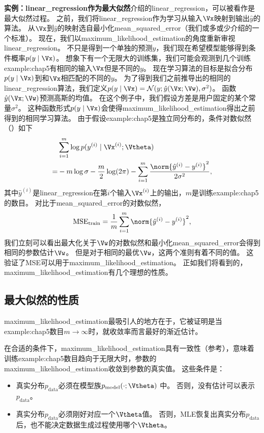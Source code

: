 \textbf{实例：\gls{linear_regression}作为最大似然}\quad {}介绍的\gls{linear_regression}，可以被看作是最大似然过程。
之前，我们将\gls{linear_regression}作为学习从输入$\Vx$映射到输出$\hat{y}$的算法。
从$\Vx$到$\hat{y}$的映射选自最小化\gls{mean_squared_error}（我们或多或少介绍的一个标准）。
现在，我们以\gls{maximum_likelihood_estimation}的角度重新审视\gls{linear_regression}。
不只是得到一个单独的预测$\hat{y}$，我们现在希望模型能够得到条件概率$p(y \mid \Vx)$。
想象下有一个无限大的训练集，我们可能会观测到几个训练\gls{example:chap5}有相同的输入$\Vx$但是不同的$y$。
现在学习算法的目标是拟合分布$p(y \mid \Vx)$到和$\Vx$相匹配的不同的$y$。
为了得到我们之前推导出的相同的\gls{linear_regression}算法，我们定义$p(y \mid \Vx) = \mathcal{N}(y; \hat{y}(\Vx; \Vw), \sigma^2)$。
函数$\hat{y}(\Vx; \Vw)$预测高斯的均值。
在这个例子中，我们假设方差是用户固定的某个常量$\sigma^2$。
这种函数形式$p(y \mid \Vx)$会使得\gls{maximum_likelihood_estimation}得出之前得到的相同学习算法。
由于假设\gls{example:chap5}是独立同分布的，条件对数似然（）如下
\begin{align}
     & \sum_{i=1}^m \log p(y^{(i)} \mid \Vx^{(i)}; \Vtheta) \\
    =& -m \log\sigma - \frac{m}{2} \log(2\pi) - \sum_{i=1}^m \frac{ \norm{\hat{y}^{(i)} - y^{(i)} }^2 }{2\sigma^2},
\end{align}
其中$\hat{y}^{(i)}$是\gls{linear_regression}在第$i$个输入$\Vx^{(i)}$上的输出，$m$是训练\gls{example:chap5}的数目。
对比于\gls{mean_squared_error}的对数似然，
\begin{equation}
    \text{MSE}_{\text{train}} = \frac{1}{m} \sum_{i=1}^m \norm{\hat{y}^{(i)} - y^{(i)}}^2,
\end{equation}
我们立刻可以看出最大化关于$\Vw$的对数似然和最小化\gls{mean_squared_error}会得到相同的参数估计$\Vw$。
但是对于相同的最优$\Vw$，这两个准则有着不同的值。
这验证了MSE可以用于\gls{maximum_likelihood_estimation}。
正如我们将看到的，\gls{maximum_likelihood_estimation}有几个理想的性质。


\subsection{最大似然的性质}
\label{sec:properties_of_maximum_likelihood}
\gls{maximum_likelihood_estimation}最吸引人的地方在于，它被证明是当\gls{example:chap5}数目$m\to\infty$时，就收敛率而言最好的渐近估计。

在合适的条件下，\gls{maximum_likelihood_estimation}具有一致性（参考），意味着训练\gls{example:chap5}数目趋向于无限大时，参数的\gls{maximum_likelihood_estimation}收敛到参数的真实值。
这些条件是：
\begin{itemize}
    \item 真实分布$p_{\text{data}}$必须在模型族$p_{\text{model}}(\cdot; \Vtheta)$ 中。
    否则，没有估计可以表示$p_{\text{data}}$。
    
    \item 真实分布$p_{\text{data}}$必须刚好对应一个$\Vtheta$值。
    否则，\gls{MLE}恢复出真实分布$p_{\text{data}}$后，也不能决定数据生成过程使用哪个$\Vtheta$。
\end{itemize}

